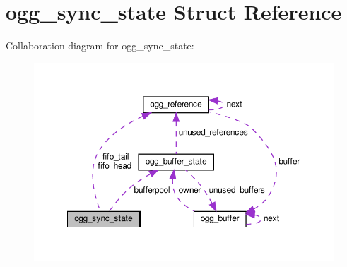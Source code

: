 \hypertarget{structogg__sync__state}{}\section{ogg\+\_\+sync\+\_\+state Struct Reference}
\label{structogg__sync__state}


Collaboration diagram for ogg\+\_\+sync\+\_\+state\+:
\nopagebreak
\begin{figure}[H]
\begin{center}
\leavevmode
\includegraphics[width=350pt]{structogg__sync__state__coll__graph}
\end{center}
\end{figure}
